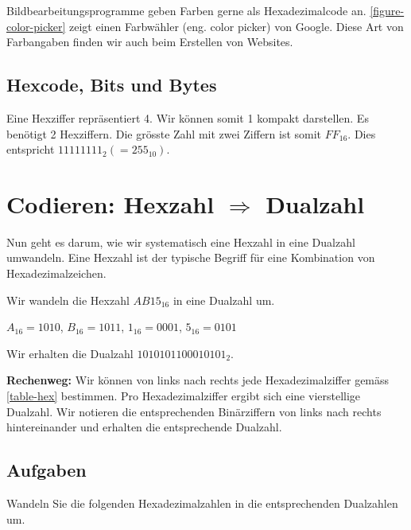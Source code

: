 \begin{example}[Farbauswahl]
Bildbearbeitungsprogramme geben Farben gerne als Hexadezimalcode an. \autoref{figure-color-picker} zeigt einen Farbwähler (eng. color picker) von Google. Diese Art von Farbangaben finden wir auch beim Erstellen von Websites.
\end{example}

\subsection{Hexcode, Bits und Bytes}

Eine Hexziffer repräsentiert \qty{4}{\bit}. Wir können somit \qty{1}{\byte} kompakt darstellen. Es benötigt \num{2} Hexziffern. Die grösste Zahl mit zwei Ziffern ist somit $FF_{16}$. Dies entspricht $11111111_2 (= 255_{10})$.

\section{Codieren: Hexzahl $\Rightarrow$ Dualzahl}

Nun geht es darum, wie wir systematisch eine Hexzahl in eine Dualzahl umwandeln. Eine Hexzahl ist der typische Begriff für eine Kombination von Hexadezimalzeichen.

\begin{example}

Wir wandeln die Hexzahl $AB15_{16}$ in eine Dualzahl um.

\begin{center}
$A_{16} = 1010$, $B_{16} = 1011$, $1_{16} = 0001$, $5_{16} = 0101$
\end{center}

Wir erhalten die Dualzahl $1010101100010101_{2}$.

\end{example}

\textbf{Rechenweg:} Wir können von links nach rechts jede Hexadezimalziffer gemäss \autoref{table-hex} bestimmen. Pro Hexadezimalziffer ergibt sich eine vierstellige Dualzahl. Wir notieren die entsprechenden Binärziffern von links nach rechts hintereinander und erhalten die entsprechende Dualzahl.

\subsection{Aufgaben}
\label{subsection-hex2dual-aufgaben}


Wandeln Sie die folgenden Hexadezimalzahlen in die entsprechenden Dualzahlen um.

